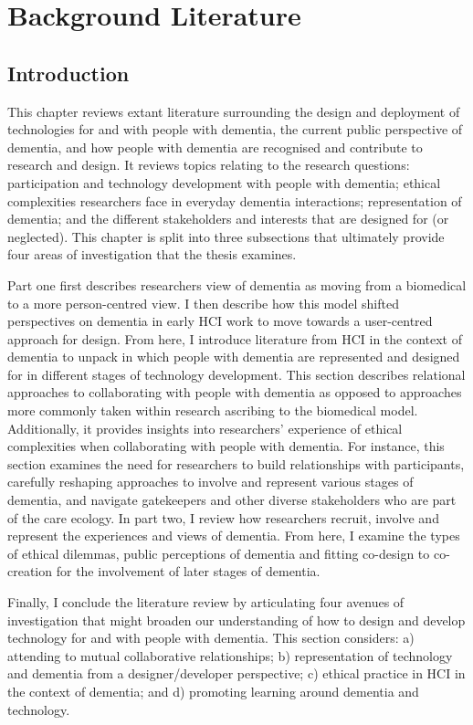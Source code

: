 \chapter{Background Literature}
\label{BackgroundLit}

\section{Introduction}
\label{BL:Intro}
This chapter reviews extant literature surrounding the design and deployment of technologies for and with people with dementia, the current public perspective of dementia, and how people with dementia are recognised and contribute to research and design. It reviews topics relating to the research questions: participation and technology development with people with dementia; ethical complexities researchers face in everyday dementia interactions; representation of dementia; and the different stakeholders and interests that are designed for (or neglected). This chapter is split into three subsections that ultimately provide four areas of investigation that the thesis examines.

Part one first describes researchers view of dementia as moving from a biomedical to a more person-centred view. I then describe how this model shifted perspectives on dementia in early HCI work to move towards a user-centred approach for design. From here, I introduce literature from HCI in the context of dementia to unpack in which people with dementia are represented and designed for in different stages of technology development. This section describes relational approaches to collaborating with people with dementia as opposed to approaches more commonly taken within research ascribing to the biomedical model. Additionally, it provides insights into researchers' experience of ethical complexities when collaborating with people with dementia. For instance, this section examines the need for researchers to build relationships with participants, carefully reshaping approaches to involve and represent various stages of dementia, and navigate gatekeepers and other diverse stakeholders who are part of the care ecology. In part two, I review how researchers recruit, involve and represent the experiences and views of dementia. From here, I examine the types of ethical dilemmas, public perceptions of dementia and fitting co-design to co-creation for the involvement of later stages of dementia.

Finally, I conclude the literature review by articulating four avenues of investigation that might broaden our understanding of how to design and develop technology for and with people with dementia. This section considers: a) attending to mutual collaborative relationships; b) representation of technology and dementia from a designer/developer perspective; c) ethical practice in HCI in the context of dementia; and d) promoting learning around dementia and technology.

